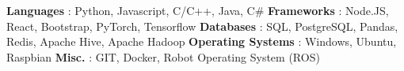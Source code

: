 \begin{cventries}  
\skillentry
    {
    \space \textbf{Languages} : Python, Javascript, C/C++, Java, C\#
    \space \textbf{Frameworks} : Node.JS, React, Bootstrap, PyTorch,  Tensorflow
    \space \textbf{Databases} : SQL, PostgreSQL, Pandas, Redis, Apache Hive, Apache Hadoop
    \space \textbf{Operating Systems} : Windows, Ubuntu, Raspbian
    \space \textbf{Misc.} : GIT, Docker, Robot Operating System (ROS)
    }
    

\end{cventries}
\vspace{0.5 cm}